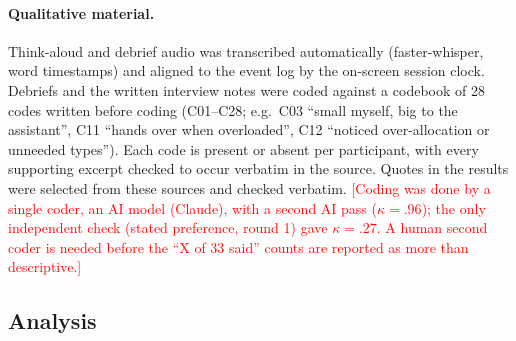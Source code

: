 \documentclass[10pt]{article}
\theoremstyle{definition}
\newcommand{\todo}[1]{\textcolor{red}{[#1]}}
\begin{document}
\paragraph{Qualitative material.} Think-aloud and debrief audio was transcribed automatically (faster-whisper, word
timestamps) and aligned to the event log by the on-screen session clock. Debriefs and the written interview notes
were coded against a codebook of 28 codes written before coding (C01--C28; e.g.\ C03 ``small myself, big to the
assistant'', C11 ``hands over when overloaded'', C12 ``noticed over-allocation or unneeded types''). Each code is
present or absent per participant, with every supporting excerpt checked to occur verbatim in the source. Quotes in
the results were selected from these sources and checked verbatim. \todo{Coding was done by a single coder, an AI
model (Claude), with a second AI pass ($\kappa = .96$); the only independent check (stated preference, round 1) gave
$\kappa = .27$. A human second coder is needed before the ``X of 33 said'' counts are reported as more than
descriptive.}

\subsection{Analysis}\label{sec:analysis}
\end{document}
